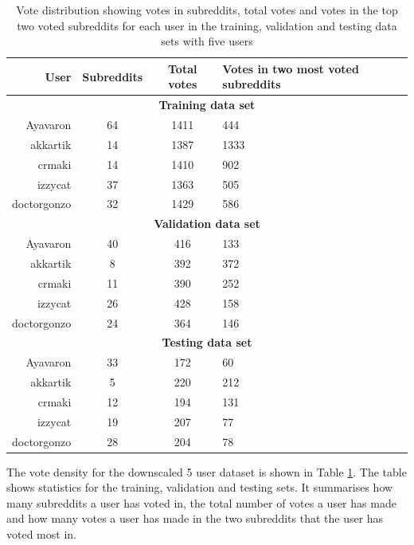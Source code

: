 \begin{table}[h!]
    \centering
    \begin{tabular}{ r | c | c | p{4cm}  }
    \textbf{User} & \textbf{Subreddits} & \textbf{Total votes} & \textbf{Votes in two most voted subreddits} \\ \hline \hline
    \multicolumn{4}{c}{\textbf{Training data set}} \\ \hline \hline
    Ayavaron & 64 & 1411 & 444 \\ \hline
    akkartik & 14  & 1387 & 1333 \\ \hline
    crmaki & 14 & 1410 & 902 \\ \hline
    izzycat & 37 & 1363 & 505 \\ \hline
    doctorgonzo & 32 & 1429 & 586 \\ \hline \hline
    \multicolumn{4}{c}{\textbf{Validation data set}} \\ \hline \hline
    Ayavaron & 40 & 416 & 133 \\ \hline
    akkartik & 8  & 392 & 372 \\ \hline
    crmaki & 11 & 390 & 252 \\ \hline
    izzycat & 26 & 428 & 158 \\ \hline
    doctorgonzo & 24 & 364 & 146 \\ \hline \hline
    \multicolumn{4}{c}{\textbf{Testing data set}} \\ \hline \hline
    Ayavaron & 33 & 172 & 60 \\ \hline
    akkartik & 5  & 220 & 212 \\ \hline
    crmaki & 12 & 194 & 131 \\ \hline
    izzycat & 19 & 207 & 77 \\ \hline
    doctorgonzo & 28 & 204 & 78 \\ \hline
    \end{tabular}
    \caption{Vote distribution showing votes in subreddits, total votes and votes in the top two voted subreddits for each user in the training, validation and testing data sets with five users}
    \label{table:5_user_density}
\end{table}
The vote density for the downscaled 5 user dataset is shown in Table \ref{table:5_user_density}. The table shows statistics for the training, validation and testing sets. It summarises how many subreddits a user has voted in, the total number of votes a user has made and how many votes a user has made in the two subreddits that the user has voted most in.

